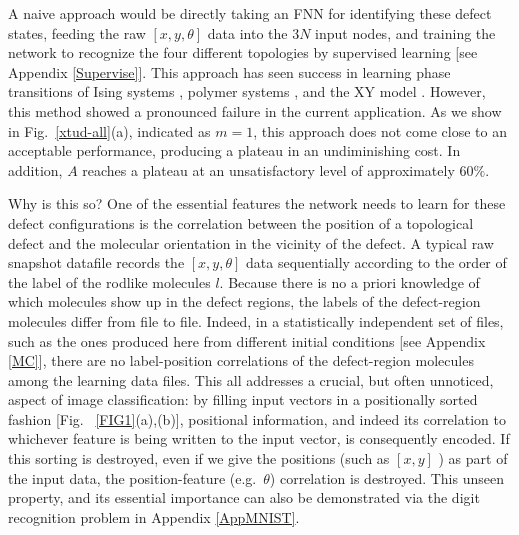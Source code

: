 
A naive approach would be directly taking an FNN for identifying these defect states, feeding the raw $[x,y,\theta]$ data into the $3N$ input nodes, and training the network to recognize the four different topologies by supervised learning [see Appendix \ref{Supervise}].
This approach has seen success in learning phase transitions of Ising systems \cite{carras}, polymer systems \cite{wei}, and the XY model \cite{beach}. However, this method showed a pronounced failure in the current application.
As we show in Fig.~\ref{xtud-all}(a), indicated as $m=1$, this approach does not come close to an acceptable performance, producing a plateau in an undiminishing cost. In addition, $A$ reaches a plateau at an unsatisfactory level of approximately $60\%$.

Why is this so?
One of the essential features the network needs to learn for these defect configurations is the correlation between the position of a topological defect and the molecular orientation in the vicinity of the defect. A typical raw snapshot datafile records the $[x,y,\theta]$ data sequentially according to the order of the label of the rodlike molecules $l$. Because there is no a priori knowledge of which molecules show up in the defect regions, the labels of the defect-region molecules differ from file to file. Indeed, in a statistically independent set of files, such as the ones produced here from different initial conditions [see Appendix \ref{MC}], there are no label-position correlations of the defect-region molecules among the learning data files.
This all addresses a crucial, but often unnoticed, aspect of image classification: by filling input vectors in a positionally sorted fashion [Fig.~ \ref{FIG1}(a),(b)], positional information, and indeed its correlation to whichever feature is being written to the input vector, is consequently encoded. If this sorting is destroyed, even if we give the positions (such as $[x,y]$
) as part of the input data, the position-feature (e.g.\ $\theta$) correlation is destroyed. This unseen property, and its essential importance can also be demonstrated via the digit recognition problem in Appendix \ref{AppMNIST}.

